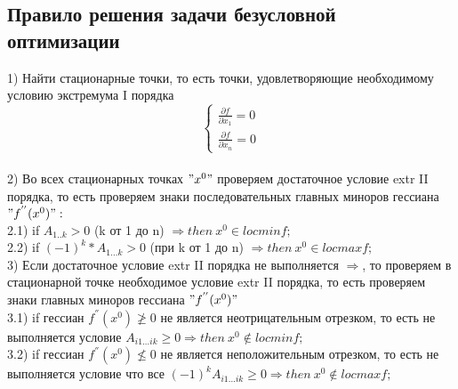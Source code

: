 \subsection{Правило решения задачи безусловной оптимизации}
1) Найти стационарные точки, то есть точки, удовлетворяющие необходимому условию экстремума I порядка \\
$$
\begin{cases}
\frac{\partial f}{\partial x_1} = 0 \\
\frac{\partial f}{\partial x_n} = 0
\end{cases}
$$
\\
2) Во всех стационарных точках $"x^0"$ проверяем достаточное условие extr II порядка, то есть проверяем знаки последовательных главных миноров гессиана $"f^{''}(x^0)":$ \\
2.1) if $A_{1..k}>0$ (k от 1 до n) $\Rightarrow then \ x^0 \in locminf;$ \\
2.2) if $(-1)^k*A_{1...k} > 0$ (при k от 1 до n) $\Rightarrow then \ x^0 \in locmaxf;$ \\
3) Если достаточное условие extr II порядка не выполняется $\Rightarrow$, то проверяем в стационарной точке необходимое условие extr II порядка, то есть проверяем знаки главных миноров гессиана $"f^{''}(x^0)"$ \\
3.1) if гессиан $f^{''}(x^0) \ngeq 0$ не является неотрицательным отрезком, то есть не выполняется условие $A_{i1...ik} \geq 0 \Rightarrow then \ x^0 \notin locminf;$ \\
3.2) if гессиан $f^{''}(x^0) \nleq 0$ не является неположительным отрезком, то есть не выполняется условие что все $(-1)^{k}A_{i1...ik} \geq 0 \Rightarrow then \ x^0 \notin locmaxf;$ \\

